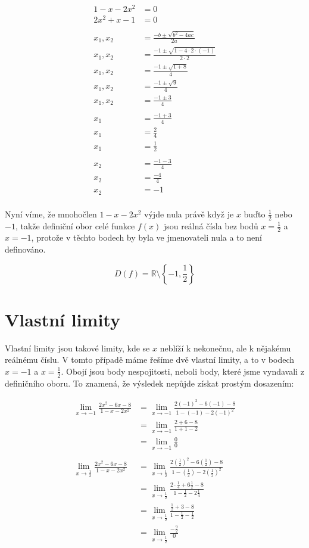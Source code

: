 \documentclass[]{article}
\begin{document}
	\begin{align*}
		1-x-2x^2 &= 0\\
		2x^2 +x - 1 &= 0 \\
		\\
		x_1, x_2 &= \frac{-b \pm \sqrt{b^2 - 4ac}}{2a} \\
		x_1, x_2 &= \frac{-1 \pm \sqrt{1 - 4\cdot2\cdot(-1)}}{2\cdot2} \\
		x_1, x_2 &= \frac{-1 \pm \sqrt{1 + 8}}{4} \\
		x_1, x_2 &= \frac{-1 \pm \sqrt{9}}{4} \\
		x_1, x_2 &= \frac{-1 \pm 3}{4} \\
		\\
		x_1 &= \frac{-1 + 3}{4}\\
		x_1 &= \frac{2}{4}\\
		x_1 &= \frac{1}{2} \\
		\\
		x_2 &= \frac{-1 - 3}{4}\\
		x_2 &= \frac{-4}{4}\\
		x_2 &= -1 \\
	\end{align*}
	
	Nyní víme, že mnohočlen $1-x-2x^2$ výjde nula právě když je $x$ buďto $\frac{1}{2}$ nebo $-1$, takže definiční obor celé funkce $f(x)$ jsou reálná čísla bez bodů $x = \frac{1}{2}$ a $x = -1$, protože v těchto bodech by byla ve jmenovateli nula a to není definováno.
	
	$$D(f) = \mathbb{R} \setminus \left\{-1, \frac{1}{2}\right\} $$
	
	\section{Vlastní limity}
	Vlastní limity jsou takové limity, kde se $x$ neblíží k nekonečnu, ale k nějakému reálnému číslu. V tomto případě máme řešíme dvě vlastní limity, a to v bodech $x = -1$ a $x = \frac{1}{2}$. Obojí jsou body nespojitosti, neboli body, které jsme vyndavali z definičního oboru. To znamená, že výsledek nepůjde získat prostým dosazením:
	
	\begin{align*}
		\lim_{x \to -1} \frac{2x^2-6x-8}{1-x-2x^2} &= \lim_{x \to -1} \frac{2(-1)^2-6(-1)-8}{1-(-1)-2(-1)^2} \\
		&= \lim_{x \to -1} \frac{2 + 6 - 8}{1+1-2} \\
		&= \lim_{x \to -1} \frac{0}{0} \\
		\\
		\lim_{x \to \frac{1}{2}} \frac{2x^2-6x-8}{1-x-2x^2} &= \lim_{x \to \frac{1}{2}} \frac{2(\frac{1}{2})^2-6(\frac{1}{2})-8}{1-(\frac{1}{2})-2(\frac{1}{2})^2} \\
		&= \lim_{x \to \frac{1}{2}} \frac{2 \cdot \frac{1}{4} + 6 \frac{1}{2} - 8}{1 - \frac{1}{2} - 2 \frac{1}{4}} \\
		&= \lim_{x \to \frac{1}{2}} \frac{\frac{1}{2} + 3 - 8}{1 - \frac{1}{2} - \frac{1}{2}} \\
		&= \lim_{x \to \frac{1}{2}} \frac{-\frac{9}{2}}{0}
	\end{align*}
	
\end{document}
